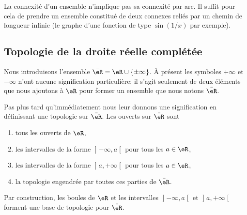 \begin{normaltext}      \label{NORMooQXKVooXOmMlX}
    La connexité d'un ensemble n'implique pas sa connexité par arc. Il suffit pour cela de prendre un ensemble constitué de deux connexes reliés par un chemin de longueur infinie (le graphe d'une fonction de type \( \sin(1/x)\) par exemple).
\end{normaltext}




\subsection{Topologie de la droite réelle complétée}
\label{SUBSECooKRRUooSlZSmM}

Nous introduisons l'ensemble \( \bar\eR=\eR\cup\{ \pm\infty \}\). À présent les symboles \( +\infty\) et \( -\infty\) n'ont aucune signification particulière; il s'agit seulement de deux éléments que nous ajoutons à \( \eR\) pour former un ensemble que nous notons \( \bar \eR\).

Pas plus tard qu'immédiatement nous leur donnons une signification en définissant une topologie sur \( \bar\eR\). Les ouverts sur \( \bar \eR\) sont
\begin{enumerate}
    \item
        tous les ouverts de \( \eR\),
    \item
        les intervalles de la forme \( \mathopen] -\infty , a \mathclose[\) pour tous les \( a\in \eR\),
    \item
        les intervalles de la forme \( \mathopen] a , +\infty \mathclose[\) pour tous les \( a\in \eR\),
    \item
        la topologie engendrée par toutes ces parties de \( \bar \eR\).
\end{enumerate}

Par construction, les boules de \( \eR\) et les intervalles \( \mathopen] -\infty , a \mathclose[\) et \( \mathopen] a , +\infty \mathclose[\) forment une base de topologie pour \( \bar \eR\).

